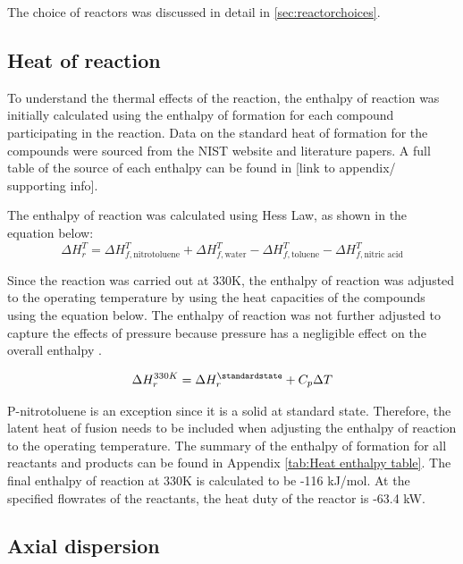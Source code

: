 The choice of reactors was discussed in detail in \cref{sec:reactorchoices}.

\subsection{Heat of reaction}
To understand the thermal effects of the reaction, the enthalpy of reaction was initially calculated using the enthalpy of formation for each compound participating in the reaction. Data on the standard heat of formation for the compounds were sourced from the NIST website and literature papers. A full table of the source of each enthalpy can be found in [link to appendix/ supporting info]. 

The enthalpy of reaction was calculated using Hess Law, as shown in the equation below:
\begin{equation}
    \Delta H_{r}^{T} = \Delta H_{f,\mathrm{nitrotoluene}}^{T} + \Delta H_{f,\mathrm{water}}^{T} - \Delta H_{f,\mathrm{toluene}}^{T} - \Delta H_{f,\text{nitric acid}}^{T}
\end{equation}

Since the reaction was carried out at 330K, the enthalpy of reaction was adjusted to the operating temperature by using the heat capacities of the compounds using the equation below. The enthalpy of reaction was not further adjusted to capture the effects of pressure because pressure has a negligible effect on the overall enthalpy \cite{liu_nitration_2019}. 

\begin{equation}
    \Delta H_{r}^{330K} = \Delta H_{r}^{\standardstate} + C_p \Delta T
\end{equation}

P-nitrotoluene is an exception since it is a solid at standard state. Therefore, the latent heat of fusion needs to be included when adjusting the enthalpy of reaction to the operating temperature. The summary of the enthalpy of formation for all reactants and products can be found in Appendix \ref{tab:Heat enthalpy table}. The final enthalpy of reaction at 330K is calculated to be -116 kJ/mol. At the specified flowrates of the reactants, the heat duty of the reactor is -63.4 kW.

\subsection{Axial dispersion}
\label{sec:axialdispersion}


